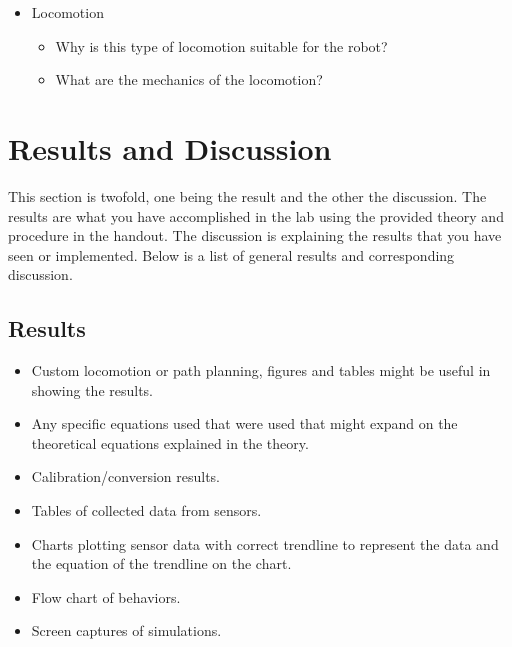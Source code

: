 \documentclass[12pt]{article}
\begin{document}
\begin{itemize}
\begin{itemize}
        \item Does this behavior require feedback (what sensors?)
        \item What actions are taken within the behavior?
    \end{itemize}
    \item Locomotion
    \begin{itemize}
        \item Why is this type of locomotion suitable for the robot?
        \item What are the mechanics of the locomotion?
    \end{itemize}
\end{itemize}

\section*{Results and Discussion}
This section is twofold, one being the result and the other the discussion. The results are what you have accomplished in the lab using the provided theory and procedure in the handout. The discussion is explaining the results that you have seen or implemented. Below is a list of general results and corresponding discussion.

\subsection*{Results}
\begin{itemize}
    \item Custom locomotion or path planning, figures and tables might be useful in showing the results.
    \item Any specific equations used that were used that might expand on the theoretical equations explained in the theory.
    \item Calibration/conversion results.
    \item Tables of collected data from sensors.
    \item Charts plotting sensor data with correct trendline to represent the data and the equation of the trendline on the chart.
    \item Flow chart of behaviors.
    \item Screen captures of simulations.
\end{itemize}
\end{document}
